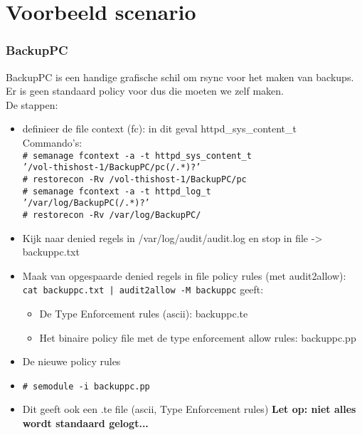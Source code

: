 \section{Voorbeeld scenario}
\begin{frame}
    \frametitle{BackupPC}
BackupPC is een handige grafische schil om rsync voor het maken van backups.
Er is geen standaard policy voor dus die moeten we zelf maken. \\
De stappen:
\footnotesize
\begin{itemize}
\item definieer de file context (fc): in dit geval httpd\_sys\_content\_t \\
Commando's: \\
{\tt \# semanage fcontext -a -t httpd\_sys\_content\_t  \\
\hspace{7pt} '/vol-thishost-1/BackupPC/pc(/.*)?' \\
\# restorecon -Rv /vol-thishost-1/BackupPC/pc \\
\# semanage fcontext -a -t httpd\_log\_t \\
\hspace{7pt} '/var/log/BackupPC(/.*)?' \\
\# restorecon -Rv /var/log/BackupPC/}
\item Kijk naar denied regels in /var/log/audit/audit.log en stop in file -> backuppc.txt
\item Maak van opgespaarde denied regels in file policy rules (met audit2allow): \\
{\tt cat backuppc.txt  | audit2allow -M backuppc} geeft:
	\begin{itemize}
	\item De Type Enforcement rules (ascii): backuppc.te
	\item Het binaire policy file met de type enforcement allow rules: backuppc.pp
	\end{itemize}
\item De nieuwe policy rules 
\item {\tt \# semodule -i backuppc.pp}
\item 
Dit geeft ook een .te file (ascii, Type Enforcement rules)
\bf{Let op:} niet alles wordt standaard gelogt...
\end{itemize}
\end{frame}
